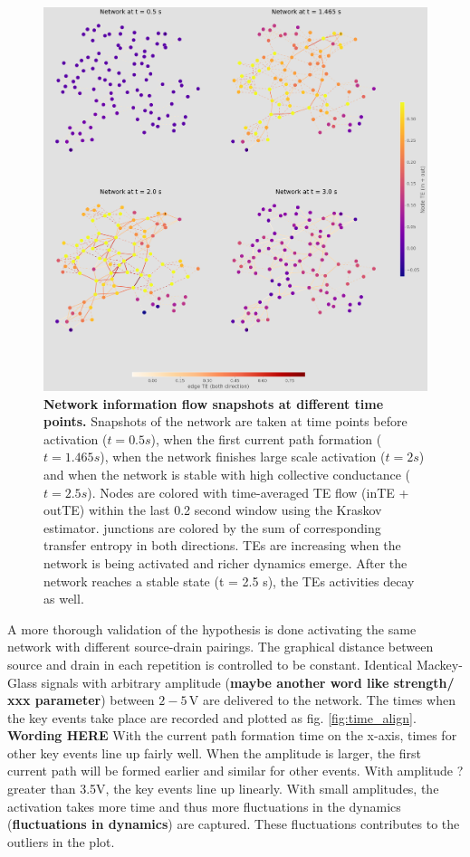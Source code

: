 \documentclass[fleqn,10pt,  amsmath,amssymb,aps]{wlscirep}
\begin{document}
\begin{figure}[]
	\centering
	\includegraphics[width = 0.8\paperwidth]{figure/time_network_comparison}
	\caption{\textbf{Network information flow snapshots at different time points.}
			Snapshots of the network are taken at time points before activation ($t = 0.5s$), when the first current path formation ($t=1.465s$), when the network finishes large scale activation ($t = 2s$) and when the network is stable with high collective conductance ($t = 2.5s$).
			Nodes are colored with time-averaged TE flow (inTE + outTE) within the last 0.2 second window using the Kraskov estimator. junctions are colored by the sum of corresponding transfer entropy in both directions. TEs are increasing when the network is being activated and richer dynamics emerge. After the network reaches a stable state (t = 2.5 s), the TEs activities decay as well.}
	\label{fig:network_comparison}
\end{figure}

A more thorough validation of the hypothesis is done activating the same network with different source-drain pairings. The graphical distance between source and drain in each repetition is controlled to be constant. Identical Mackey-Glass signals with arbitrary amplitude (\textbf{maybe another word like strength/ xxx parameter}) between $2-5\,$V are delivered to the network. The times when the key events take place are recorded and plotted as fig. \ref{fig:time_align}. \textbf{Wording HERE} With the current path formation time on the x-axis, times for other key events line up fairly well. When the amplitude is larger, the first current path will be formed earlier and similar for other events. With amplitude ? greater than 3.5V, the key events line up linearly. With small amplitudes, the activation takes more time and thus more fluctuations in the dynamics (\textbf{fluctuations in dynamics}) are captured. These fluctuations contributes to the outliers in the plot.
\end{document}
